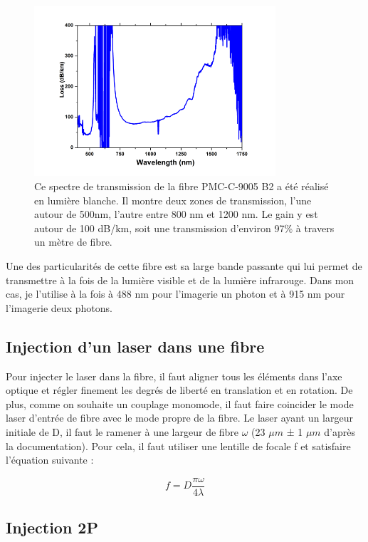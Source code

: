 \begin{figure}
\centering
\includegraphics[width=0.8\textwidth]{./files/fiber_gain.png}
\caption{Ce spectre de transmission de la fibre PMC-C-9005 B2 a été réalisé en lumière blanche. Il montre deux zones de transmission, l'une autour de 500nm, l'autre entre 800 nm et 1200 nm. Le gain y est autour de 100 dB/km, soit une transmission d'environ 97\% à travers un mètre de fibre.}
\end{figure}

Une des particularités de cette fibre est sa large bande passante qui lui permet de transmettre à la fois de la lumière visible et de la lumière infrarouge. Dans mon cas, je l'utilise à la fois à 488 nm pour l'imagerie un photon et à 915 nm pour l'imagerie deux photons.

\subsection{Injection d'un laser dans une fibre}

Pour injecter le laser dans la fibre, il faut aligner tous les éléments dans l'axe optique et régler finement les degrés de liberté en translation et en rotation. De plus, comme on souhaite un couplage monomode, il faut faire coincider le mode laser d'entrée de fibre avec le mode propre de la fibre. Le laser ayant un largeur initiale de D, il faut le ramener à une largeur de fibre $\omega$ (23 $\mu m$ ± 1 $\mu m$ d'après la documentation). Pour cela, il faut utiliser une lentille de focale f et satisfaire l'équation suivante :

$$
f = D\frac{\pi\omega}{4\lambda}
$$

\subsection{Injection 2P}

